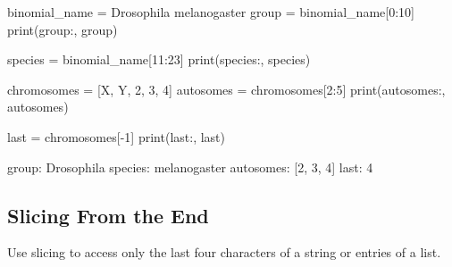 \documentclass[
  letterpaper,
  DIV=11,
  numbers=noendperiod]{scrartcl}
\newenvironment{Shaded}{\begin{snugshade}}{\end{snugshade}}
\newcommand{\BuiltInTok}[1]{\textcolor[rgb]{0.00,0.23,0.31}{#1}}
\newcommand{\DecValTok}[1]{\textcolor[rgb]{0.68,0.00,0.00}{#1}}
\newcommand{\NormalTok}[1]{\textcolor[rgb]{0.00,0.23,0.31}{#1}}
\newcommand{\OperatorTok}[1]{\textcolor[rgb]{0.37,0.37,0.37}{#1}}
\newcommand{\StringTok}[1]{\textcolor[rgb]{0.13,0.47,0.30}{#1}}
\theoremstyle{remark}
\begin{document}
\begin{Shaded}
\begin{Highlighting}[]
\NormalTok{binomial\_name }\OperatorTok{=} \StringTok{\textquotesingle{}Drosophila melanogaster\textquotesingle{}}
\NormalTok{group }\OperatorTok{=}\NormalTok{ binomial\_name[}\DecValTok{0}\NormalTok{:}\DecValTok{10}\NormalTok{]}
\BuiltInTok{print}\NormalTok{(}\StringTok{\textquotesingle{}group:\textquotesingle{}}\NormalTok{, group)}

\NormalTok{species }\OperatorTok{=}\NormalTok{ binomial\_name[}\DecValTok{11}\NormalTok{:}\DecValTok{23}\NormalTok{]}
\BuiltInTok{print}\NormalTok{(}\StringTok{\textquotesingle{}species:\textquotesingle{}}\NormalTok{, species)}

\NormalTok{chromosomes }\OperatorTok{=}\NormalTok{ [}\StringTok{\textquotesingle{}X\textquotesingle{}}\NormalTok{, }\StringTok{\textquotesingle{}Y\textquotesingle{}}\NormalTok{, }\StringTok{\textquotesingle{}2\textquotesingle{}}\NormalTok{, }\StringTok{\textquotesingle{}3\textquotesingle{}}\NormalTok{, }\StringTok{\textquotesingle{}4\textquotesingle{}}\NormalTok{]}
\NormalTok{autosomes }\OperatorTok{=}\NormalTok{ chromosomes[}\DecValTok{2}\NormalTok{:}\DecValTok{5}\NormalTok{]}
\BuiltInTok{print}\NormalTok{(}\StringTok{\textquotesingle{}autosomes:\textquotesingle{}}\NormalTok{, autosomes)}

\NormalTok{last }\OperatorTok{=}\NormalTok{ chromosomes[}\OperatorTok{{-}}\DecValTok{1}\NormalTok{]}
\BuiltInTok{print}\NormalTok{(}\StringTok{\textquotesingle{}last:\textquotesingle{}}\NormalTok{, last)}
\end{Highlighting}
\end{Shaded}

\begin{Shaded}
\begin{Highlighting}[]
\NormalTok{group: Drosophila}
\NormalTok{species: melanogaster}
\NormalTok{autosomes: [\textquotesingle{}2\textquotesingle{}, \textquotesingle{}3\textquotesingle{}, \textquotesingle{}4\textquotesingle{}]}
\NormalTok{last: 4}
\end{Highlighting}
\end{Shaded}

\subsection{Slicing From the End}\label{slicing-from-the-end}

Use slicing to access only the last four characters of a string or
entries of a list.
\end{document}

